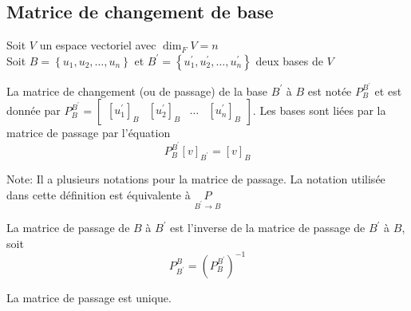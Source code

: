 \subsection{Matrice de changement de base}

Soit $V$ un espace vectoriel avec $\dim_F V = n$ \\
Soit $B = \left\{ u_1, u_2, \dots, u_n \right\}$ et $B^\prime = \left\{ u_1^\prime, u_2^\prime, \dots, u_n^\prime \right\}$ deux bases de $V$ 
\begin{definition}
      La matrice de changement (ou de passage) de la base $B^\prime$ à $B$ est notée
      $P^{B^\prime}_B$ et est donnée par $P^{B^\prime}_B = \begin{bmatrix}
           [ u_1^\prime]_B & [u_2^\prime]_B & \dots & [u_n^\prime]_B
      \end{bmatrix}$. Les bases sont liées par la matrice de passage par l'équation 
      \[P^{B^\prime}_B [v]_{B^\prime} = [v]_B\]
\end{definition}
Note: Il a plusieurs notations pour la matrice de passage. La notation utilisée
dans cette définition est équivalente à $\underset{B^\prime \to B}{P}$
\begin{lemma}
      La matrice de passage de $B$ à $B^\prime$ est l'inverse de la matrice de passage de 
      $B^\prime$ à $B$, soit \[P^B_{B^\prime} = \left(P^{B^\prime}_B\right)^{-1}\]
\end{lemma}
\begin{lemma}
      La matrice de passage est unique.
\end{lemma}

